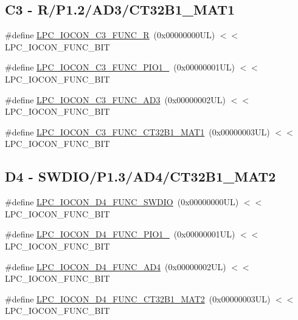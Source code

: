\subsection*{C3 -\/ R/\+P1.2/\+A\+D3/\+C\+T32\+B1\+\_\+\+M\+A\+T1}
\begin{DoxyCompactItemize}
\item 
\#define \hyperlink{group___l_p_c___i_o_c_o_n___l_p_c1102___p_i_n_e_s_ga0ce0c613a070b5c4df0d5cc9ceda8295}{L\+P\+C\+\_\+\+I\+O\+C\+O\+N\+\_\+\+C3\+\_\+\+F\+U\+N\+C\+\_\+R}~(0x00000000\+U\+L) $<$$<$ L\+P\+C\+\_\+\+I\+O\+C\+O\+N\+\_\+\+F\+U\+N\+C\+\_\+\+B\+IT
\item 
\#define \hyperlink{group___l_p_c___i_o_c_o_n___l_p_c1102___p_i_n_e_s_ga0a8c9225a9d80bf16239e67d7e321bf3}{L\+P\+C\+\_\+\+I\+O\+C\+O\+N\+\_\+\+C3\+\_\+\+F\+U\+N\+C\+\_\+\+P\+I\+O1\+\_}~(0x00000001\+U\+L) $<$$<$ L\+P\+C\+\_\+\+I\+O\+C\+O\+N\+\_\+\+F\+U\+N\+C\+\_\+\+B\+IT
\item 
\#define \hyperlink{group___l_p_c___i_o_c_o_n___l_p_c1102___p_i_n_e_s_ga3ba9a8b0b1234e4b1d8d8f2ebf5cbec6}{L\+P\+C\+\_\+\+I\+O\+C\+O\+N\+\_\+\+C3\+\_\+\+F\+U\+N\+C\+\_\+\+A\+D3}~(0x00000002\+U\+L) $<$$<$ L\+P\+C\+\_\+\+I\+O\+C\+O\+N\+\_\+\+F\+U\+N\+C\+\_\+\+B\+IT
\item 
\#define \hyperlink{group___l_p_c___i_o_c_o_n___l_p_c1102___p_i_n_e_s_gafb52d80ad556237649f92c38416825d3}{L\+P\+C\+\_\+\+I\+O\+C\+O\+N\+\_\+\+C3\+\_\+\+F\+U\+N\+C\+\_\+\+C\+T32\+B1\+\_\+\+M\+A\+T1}~(0x00000003\+U\+L) $<$$<$ L\+P\+C\+\_\+\+I\+O\+C\+O\+N\+\_\+\+F\+U\+N\+C\+\_\+\+B\+IT
\end{DoxyCompactItemize}
\subsection*{D4 -\/ S\+W\+D\+I\+O/\+P1.3/\+A\+D4/\+C\+T32\+B1\+\_\+\+M\+A\+T2}
\begin{DoxyCompactItemize}
\item 
\#define \hyperlink{group___l_p_c___i_o_c_o_n___l_p_c1102___p_i_n_e_s_ga7d0843dbf1f39f41e01cdcf0ea1396f8}{L\+P\+C\+\_\+\+I\+O\+C\+O\+N\+\_\+\+D4\+\_\+\+F\+U\+N\+C\+\_\+\+S\+W\+D\+IO}~(0x00000000\+U\+L) $<$$<$ L\+P\+C\+\_\+\+I\+O\+C\+O\+N\+\_\+\+F\+U\+N\+C\+\_\+\+B\+IT
\item 
\#define \hyperlink{group___l_p_c___i_o_c_o_n___l_p_c1102___p_i_n_e_s_ga029a20695f231fa2f81d7bd0642a6f85}{L\+P\+C\+\_\+\+I\+O\+C\+O\+N\+\_\+\+D4\+\_\+\+F\+U\+N\+C\+\_\+\+P\+I\+O1\+\_}~(0x00000001\+U\+L) $<$$<$ L\+P\+C\+\_\+\+I\+O\+C\+O\+N\+\_\+\+F\+U\+N\+C\+\_\+\+B\+IT
\item 
\#define \hyperlink{group___l_p_c___i_o_c_o_n___l_p_c1102___p_i_n_e_s_ga73cef70ce7760ccd240ddf0b26a33656}{L\+P\+C\+\_\+\+I\+O\+C\+O\+N\+\_\+\+D4\+\_\+\+F\+U\+N\+C\+\_\+\+A\+D4}~(0x00000002\+U\+L) $<$$<$ L\+P\+C\+\_\+\+I\+O\+C\+O\+N\+\_\+\+F\+U\+N\+C\+\_\+\+B\+IT
\item 
\#define \hyperlink{group___l_p_c___i_o_c_o_n___l_p_c1102___p_i_n_e_s_ga07986c77c1b43eb5994da559abfda911}{L\+P\+C\+\_\+\+I\+O\+C\+O\+N\+\_\+\+D4\+\_\+\+F\+U\+N\+C\+\_\+\+C\+T32\+B1\+\_\+\+M\+A\+T2}~(0x00000003\+U\+L) $<$$<$ L\+P\+C\+\_\+\+I\+O\+C\+O\+N\+\_\+\+F\+U\+N\+C\+\_\+\+B\+IT
\end{DoxyCompactItemize}
